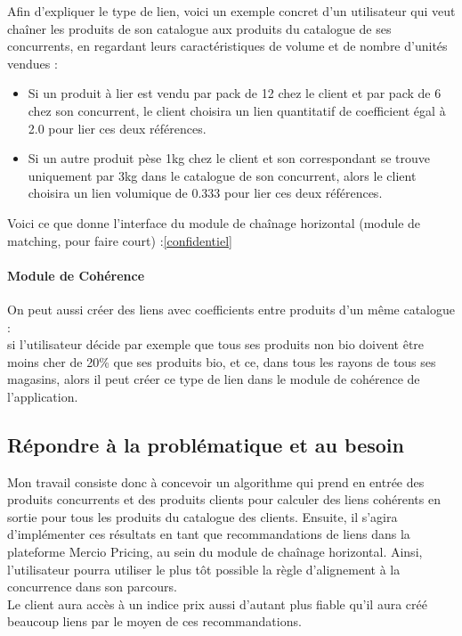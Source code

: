 \documentclass{rapportCS}
\begin{document}
Afin d'expliquer le type de lien, voici un exemple concret d'un utilisateur qui veut chaîner les produits de son
catalogue aux produits du catalogue de ses concurrents,
en regardant leurs caractéristiques de volume et de nombre d'unités vendues :\\
\begin{itemize}
  \item Si un produit à lier est vendu par pack de 12 chez le client et par pack de 6 chez son concurrent, le client
choisira un lien quantitatif de coefficient égal à 2.0 pour lier ces deux références. \\
  \item Si un autre produit pèse 1kg chez le client et son correspondant se trouve uniquement par 3kg dans
le catalogue de son concurrent, alors le client choisira un lien volumique de 0.333 pour lier ces deux références. 
\end{itemize}

Voici ce que donne l'interface du module de chaînage horizontal (module de matching, pour faire court) :\ref{confidentiel}

\paragraph{Module de Cohérence}
On peut aussi créer des liens avec coefficients entre produits d'un même catalogue : \\
si l'utilisateur décide par exemple que tous ses produits non 
bio doivent être moins cher de 20\% que ses produits bio,
et ce, dans tous les rayons de tous ses magasins, alors il peut créer ce type de lien 
dans le module de cohérence de l'application.

\subsection{Répondre à la problématique et au besoin}
Mon travail consiste donc à concevoir un algorithme qui prend en entrée des produits concurrents et 
des produits clients pour calculer des liens cohérents en sortie pour tous les produits du catalogue des clients.
Ensuite, il s'agira d'implémenter ces résultats en tant que recommandations de liens dans la
plateforme Mercio Pricing, au sein du module de chaînage horizontal. 
Ainsi, l'utilisateur pourra utiliser le plus tôt possible la règle
d'alignement à la concurrence dans son parcours. \\
Le client aura accès à un indice prix aussi d'autant plus fiable
qu'il aura créé beaucoup liens par le moyen de ces recommandations.
\end{document}
